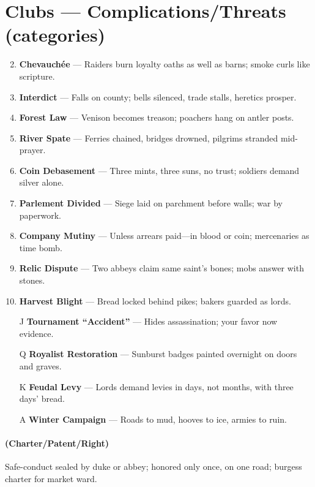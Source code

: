 \section*{Clubs --- Complications/Threats (categories)}
\label{sec:vhasia-complications}
\begin{enumerate}
\setcounter{enumi}{1}
\item \textbf{Chevauchée} --- Raiders burn loyalty oaths as well as barns; smoke curls like scripture.
\item \textbf{Interdict} --- Falls on county; bells silenced, trade stalls, heretics prosper.
\item \textbf{Forest Law} --- Venison becomes treason; poachers hang on antler posts.
\item \textbf{River Spate} --- Ferries chained, bridges drowned, pilgrims stranded mid-prayer.
\item \textbf{Coin Debasement} --- Three mints, three suns, no trust; soldiers demand silver alone.
\item \textbf{Parlement Divided} --- Siege laid on parchment before walls; war by paperwork.
\item \textbf{Company Mutiny} --- Unless arrears paid—in blood or coin; mercenaries as time bomb.
\item \textbf{Relic Dispute} --- Two abbeys claim same saint's bones; mobs answer with stones.
\item \textbf{Harvest Blight} --- Bread locked behind pikes; bakers guarded as lords.
\item[J] \textbf{Tournament ``Accident''} --- Hides assassination; your favor now evidence.
\item[Q] \textbf{Royalist Restoration} --- Sunburst badges painted overnight on doors and graves.
\item[K] \textbf{Feudal Levy} --- Lords demand levies in days, not months, with three days' bread.
\item[A] \textbf{Winter Campaign} --- Roads to mud, hooves to ice, armies to ruin.
\end{enumerate}

\paragraph*{(Charter/Patent/Right)} Safe-conduct sealed by duke or abbey; honored only once, on one road; burgess charter for market ward.

